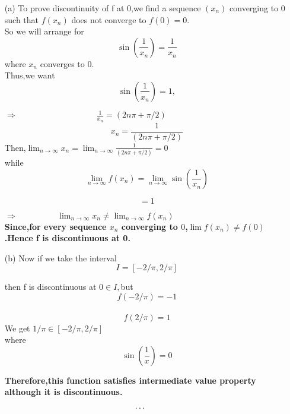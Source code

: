 \documentclass[12pt]{article}
\begin{document}
\begin{itemize}
	\item [(a)] To prove discontinuity of f at 0,we find a sequence $(x_n)$ converging to 0 such that $f(x_n)$ does not converge to $f(0)=0$.\\
	So we will arrange for\\$$\sin\left(\frac{1}{x_n}\right)=\frac{1}{x_n}$$
	where $x_n$ converges to 0.\\
	Thus,we want $$\sin\left(\frac{1}{x_n}\right)=1,$$
	
	$ \Rightarrow \hspace{4cm}  \frac{1}{x_n} = (2n\pi+\pi/2) $ \\
	$$ x_n=\frac{1}{ (2n\pi+\pi/2)} $$
	Then,$ \lim_{n\rightarrow\infty}x_n = \lim_{n\rightarrow\infty}\frac{1}{(2n\pi+\pi/2)}=0 $\\
	while
	$$\lim_{n\rightarrow\infty}f(x_n)=\lim_{n\rightarrow\infty}\sin\left(\frac{1}{x_n}\right)$$
	
	$$=1$$
	
	$ \Rightarrow \hspace{2cm} \lim_{n\rightarrow\infty}x_n \neq \lim_{n\rightarrow\infty}f(x_n) $ \\
	
	\textbf{Since,for every sequence $x_n$ converging to $0$,$\lim f(x_n) \neq f(0)$.Hence f is discontinuous at 0.}
\end{itemize}

\begin{itemize}
	\item [(b)] Now if we take the interval $$I=\left[{-2/\pi},2/\pi\right]$$
	
	then f is discontinuous at $0\in I,$but $$f\left({-2/\pi}\right)=-1$$\\
	$$f\left(2/\pi\right)=1$$
	We get $1/\pi\in\left[{-2/\pi},2/\pi\right]$\\where $$\sin\left(\frac{1}{x}\right)=0$$
	
	\textbf{Therefore,this function satisfies intermediate value property although it is discontinuous.}
\end{itemize}

$${\LARGE \cdots}$$
\end{document}
